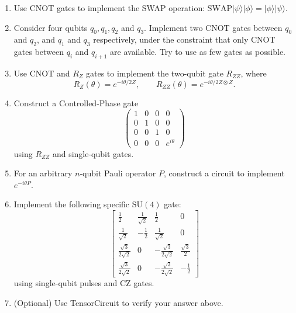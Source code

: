 \documentclass{ctexart}
\newcommand{\ket}[1]{|#1\rangle}
\begin{document}
\begin{enumerate}
    \item[(a)] Use CNOT gates to implement the SWAP operation: $\text{SWAP}\ket{\psi}\ket{\phi} = \ket{\phi}\ket{\psi}$.
    \item[(b)] Consider four qubits $q_0, q_1, q_2$ and $q_3$. Implement two CNOT gates between $q_0$ and $q_2$, and $q_1$ and $q_3$ respectively, under the constraint that only CNOT gates between $q_i$ and $q_{i+1}$ are available. Try to use as few gates as possible.
    \item[(c)] Use CNOT and $R_Z$ gates to implement the two-qubit gate $R_{ZZ}$, where
    \begin{equation*}
        R_Z(\theta) = e^{-i\theta/2 Z}, \qquad R_{ZZ}(\theta) = e^{-i\theta/2 Z\otimes Z}.
    \end{equation*}
    \item[(d)] Construct a Controlled-Phase gate
    \begin{equation*}
        \begin{pmatrix}
            1 & 0 & 0 & 0 \\
            0 & 1 & 0 & 0 \\
            0 & 0 & 1 & 0 \\
            0 & 0 & 0 & e^{i\theta}
        \end{pmatrix}
    \end{equation*}
    using $R_{ZZ}$ and single-qubit gates.
    \item[(e)] For an arbitrary $n$-qubit Pauli operator $P$, construct a circuit to implement $e^{-i\theta P}$.
    \item[(f)] Implement the following specific $\mathrm{SU}(4)$ gate:
    \begin{equation*}
        \begin{bmatrix}
            \frac{1}{2} & \frac{1}{\sqrt{2}} & \frac{1}{2} & 0 \\[6pt]
            \frac{1}{\sqrt{2}} & -\frac{1}{2} & \frac{1}{\sqrt{2}} & 0 \\[6pt]
            \frac{\sqrt{3}}{2\sqrt{2}} & 0 & -\frac{\sqrt{3}}{2\sqrt{2}} & \frac{\sqrt{3}}{2} \\[6pt]
            \frac{\sqrt{3}}{2\sqrt{2}} & 0 & -\frac{\sqrt{3}}{2\sqrt{2}} & -\frac{1}{2}
        \end{bmatrix}
    \end{equation*}
    using single-qubit pulses and CZ gates.
    \item[(g)] (Optional) Use TensorCircuit to verify your answer above.
\end{enumerate}
\end{document}
